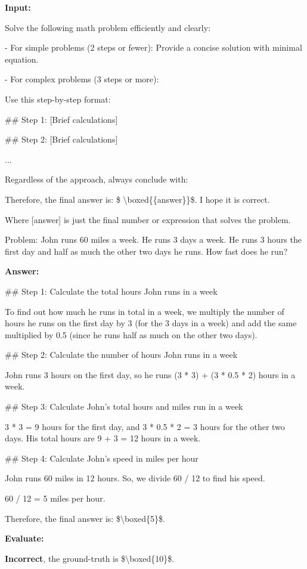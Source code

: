 \begin{tcolorbox}[
  colback=white, colframe=black, arc=3mm, width=2\columnwidth,
  title=\textbf{Example Input-Output for Zero-Shot CoT (GSM8K)},
  coltitle=white, colbacktitle=blue, fonttitle=\bfseries
]
{\bf Input:}

Solve the following math problem efficiently and clearly:

- For simple problems (2 steps or fewer): Provide a concise solution with minimal equation.

- For complex problems (3 steps or more):

Use this step-by-step format:

\#\# Step 1: [Brief calculations]

\#\# Step 2: [Brief calculations]

...

Regardless of the approach, always conclude with:

Therefore, the final answer is: \$ \textbackslash boxed\{\{answer\}\}\$. I hope it is correct.

Where [answer] is just the final number or expression that solves the problem.

Problem: John runs 60 miles a week. He runs 3 days a week.  He runs 3 hours the first day and half as much the other two days he runs.  How fast does he run?

\vspace{5pt}
\textbf{Answer:}

\#\# Step 1: Calculate the total hours John runs in a week

To find out how much he runs in total in a week, we multiply the number of hours he runs on the first day by 3 (for the 3 days in a week) and add the same multiplied by 0.5 (since he runs half as much on the other two days).

\#\# Step 2: Calculate the number of hours John runs in a week

John runs 3 hours on the first day, so he runs (3 * 3) + (3 * 0.5 * 2) hours in a week.

\#\# Step 3: Calculate John's total hours and miles run in a week

3 * 3 = 9 hours for the first day, and 3 * 0.5 * 2 = 3 hours for the other two days. His total hours are 9 + 3 = 12 hours in a week.

\#\# Step 4: Calculate John's speed in miles per hour

John runs 60 miles in 12 hours. So, we divide 60 / 12 to find his speed.

60 / 12 = 5 miles per hour.

Therefore, the final answer is: \$\textbackslash boxed\{5\}\$.

\vspace{5pt}
\textbf{Evaluate:}

{\bf \color{red}Incorrect}, the ground-truth is \$\textbackslash boxed\{10\}\$.

\end{tcolorbox}


